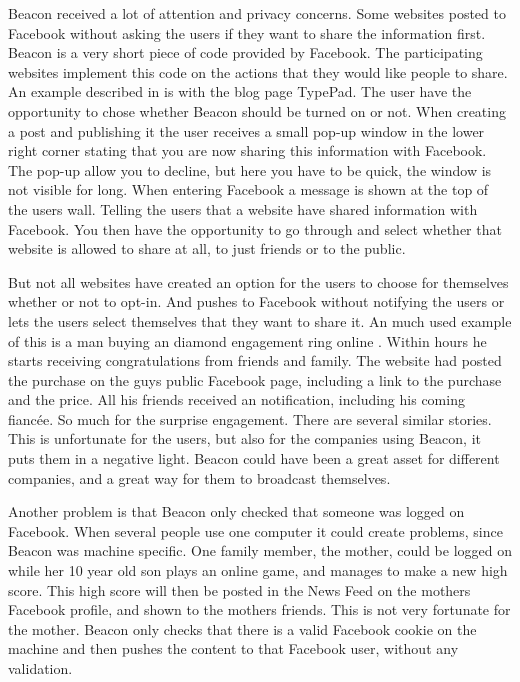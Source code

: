Beacon received a lot of attention and privacy concerns. Some websites posted to Facebook without asking the users if they want to share the information first. Beacon is a very short piece of code provided by Facebook. The participating websites implement this code on the actions that they would like people to share. An example described in \cite{beaconMarketsPerspective} is with the blog page TypePad. The user have the opportunity to chose whether Beacon should be turned on or not. When creating a post and publishing it the user receives a small pop-up window in the lower right corner stating that you are now sharing this information with Facebook. The pop-up allow you to decline, but here you have to be quick, the window is not visible for long. When entering Facebook a message is shown at the top of the users wall. Telling the users that a website have shared information with Facebook. You then have the opportunity to go through and select whether that website is allowed to share at all, to just friends or to the public.  

But not all websites have created an option for the users to choose for themselves whether or not to opt-in. And pushes to Facebook without notifying the users or lets the users select themselves that they want to share it. An much used example of this is a man buying an diamond engagement ring online \cite{ring}. Within hours he starts receiving congratulations from friends and family. The website had posted the purchase on the guys public Facebook page, including a link to the purchase and the price. All his friends received an notification, including his coming fiancée. So much for the surprise engagement. There are several similar stories.  
This is unfortunate for the users, but also for the companies using Beacon, it puts them in a negative light. Beacon could have been a great asset for different companies, and a great way for them to broadcast themselves. 

Another problem is that Beacon only checked that someone was logged on Facebook. When several people use one computer it could create problems, since Beacon was machine specific. One family member, the mother, could be logged on while her 10 year old son plays an online game, and manages to make a new high score. This high score will then be posted in the News Feed on the mothers Facebook profile, and shown to the mothers friends. This is not very fortunate for the mother. Beacon only checks that there is a valid Facebook cookie on the machine and then pushes the content to that Facebook user, without any validation. 

